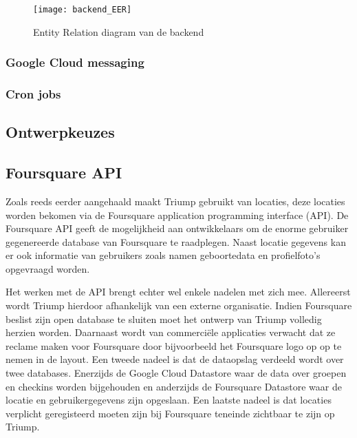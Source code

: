 \begin{figure}[H]
	\texttt{[image: backend\_EER]}
	\caption{Entity Relation diagram van de backend}
	\label{fig:Backend ER}
\end{figure}

\subsubsection{Google Cloud messaging}

\subsubsection{Cron jobs}
\subsection{Ontwerpkeuzes}



\subsection{Foursquare API}

Zoals reeds eerder aangehaald maakt Triump gebruikt van locaties, deze locaties worden bekomen via de Foursquare application programming interface (API). De Foursquare API geeft de mogelijkheid aan ontwikkelaars om de enorme gebruiker gegenereerde database van Foursquare te raadplegen. Naast locatie gegevens kan er ook informatie van gebruikers zoals namen geboortedata en profielfoto's opgevraagd worden. 

Het werken met de API brengt echter wel enkele nadelen met zich mee.
Allereerst wordt Triump hierdoor afhankelijk van een externe organisatie. Indien Foursquare beslist zijn open database te sluiten moet het ontwerp van Triump volledig herzien worden. Daarnaast wordt van commerciële applicaties verwacht dat ze reclame maken voor Foursquare door bijvoorbeeld het Foursquare logo op op te nemen in de layout.  Een tweede nadeel is dat de dataopslag verdeeld wordt over twee databases. Enerzijds de Google Cloud Datastore waar de data over groepen en checkins worden bijgehouden en anderzijds de Foursquare Datastore waar de locatie en gebruikergegevens zijn opgeslaan. Een laatste nadeel is dat locaties verplicht geregisteerd moeten zijn bij Foursquare teneinde zichtbaar te zijn op Triump. 

